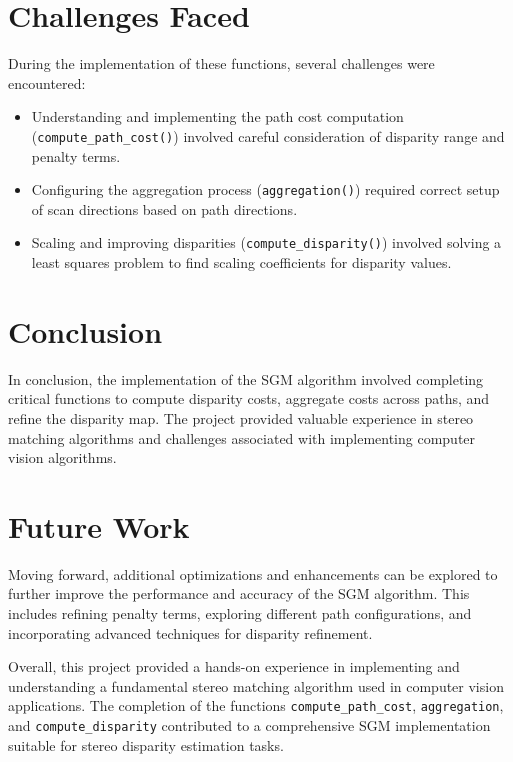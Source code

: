 \documentclass{article}
\begin{document}
\newpage

\section{Challenges Faced}
During the implementation of these functions, several challenges were encountered:

\begin{itemize}
    \item Understanding and implementing the path cost computation (\texttt{compute\_path\_cost()}) involved careful consideration of disparity range and penalty terms.
    \item Configuring the aggregation process (\texttt{aggregation()}) required correct setup of scan directions based on path directions.
    \item Scaling and improving disparities (\texttt{compute\_disparity()}) involved solving a least squares problem to find scaling coefficients for disparity values.
\end{itemize}

\section{Conclusion}
In conclusion, the implementation of the SGM algorithm involved completing critical functions to compute disparity costs, aggregate costs across paths, and refine the disparity map. The project provided valuable experience in stereo matching algorithms and challenges associated with implementing computer vision algorithms.

\section{Future Work}
Moving forward, additional optimizations and enhancements can be explored to further improve the performance and accuracy of the SGM algorithm. This includes refining penalty terms, exploring different path configurations, and incorporating advanced techniques for disparity refinement.

Overall, this project provided a hands-on experience in implementing and understanding a fundamental stereo matching algorithm used in computer vision applications. The completion of the functions \texttt{compute\_path\_cost}, \texttt{aggregation}, and \texttt{compute\_disparity} contributed to a comprehensive SGM implementation suitable for stereo disparity estimation tasks.
\end{document}
